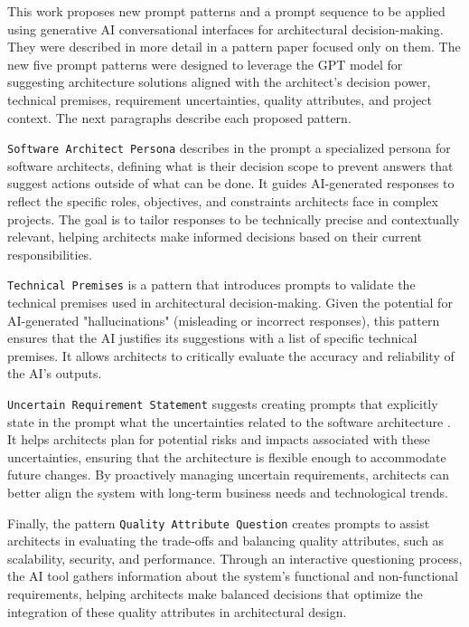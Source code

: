 \documentclass[runningheads]{llncs}
\begin{document}
This work proposes new prompt patterns and a prompt sequence to be applied using generative AI conversational interfaces for architectural decision-making. They were described in more detail in a pattern paper focused only on them\cite{maranhao2024}.  The new five prompt patterns were designed to leverage the GPT model for suggesting architecture solutions aligned with the architect's decision power, technical premises, requirement uncertainties, quality attributes, and project context.  The next paragraphs describe each proposed pattern.

\texttt{Software Architect Persona} describes in the prompt a specialized persona for software architects, defining what is their decision scope to prevent answers that suggest actions outside of what can be done. It guides AI-generated responses to reflect the specific roles, objectives, and constraints architects face in complex projects. The goal is to tailor responses to be technically precise and contextually relevant, helping architects make informed decisions based on their current responsibilities.

\texttt{Technical Premises} is a pattern that introduces prompts to validate the technical premises used in architectural decision-making. Given the potential for AI-generated "hallucinations" (misleading or incorrect responses)\cite{meyer2023}, this pattern ensures that the AI justifies its suggestions with a list of specific technical premises. It allows architects to critically evaluate the accuracy and reliability of the AI’s outputs.

\texttt{Uncertain Requirement Statement} suggests creating prompts that explicitly state in the prompt what the uncertainties related to the software architecture \cite{silva2024using}. It helps architects plan for potential risks and impacts associated with these uncertainties, ensuring that the architecture is flexible enough to accommodate future changes. By proactively managing uncertain requirements, architects can better align the system with long-term business needs and technological trends.

Finally, the pattern \texttt{Quality Attribute Question} creates prompts to assist architects in evaluating the trade-offs and balancing quality attributes, such as scalability, security, and performance. Through an interactive questioning process, the AI tool gathers information about the system’s functional and non-functional requirements, helping architects make balanced decisions that optimize the integration of these quality attributes in architectural design.
\end{document}
